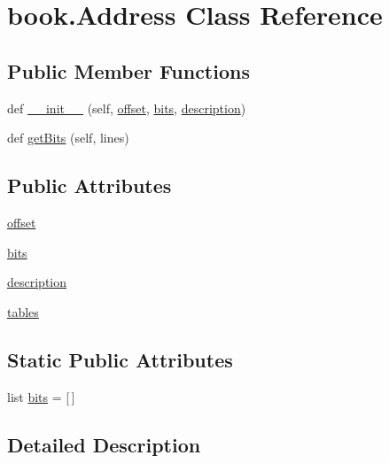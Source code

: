 \hypertarget{classbook_1_1_address}{}\section{book.\+Address Class Reference}
\label{classbook_1_1_address}
\subsection*{Public Member Functions}
\begin{DoxyCompactItemize}
\item 
def \hyperlink{classbook_1_1_address_a21dab1da29e27e05d00fc13f416518ea}{\+\_\+\+\_\+init\+\_\+\+\_\+} (self, \hyperlink{classbook_1_1_address_a1df9c6785a8eb9214ec73703b932c43f}{offset}, \hyperlink{classbook_1_1_address_a5040cf9c4f11a07654d0d621252114aa}{bits}, \hyperlink{classbook_1_1_address_aca6b57c6a0681dfb787ae74d70cf3373}{description})
\item 
def \hyperlink{classbook_1_1_address_a219368a50adc089731da0c44b8b1a880}{get\+Bits} (self, lines)
\end{DoxyCompactItemize}
\subsection*{Public Attributes}
\begin{DoxyCompactItemize}
\item 
\hyperlink{classbook_1_1_address_a1df9c6785a8eb9214ec73703b932c43f}{offset}
\item 
\hyperlink{classbook_1_1_address_abf067b8c097b85a8886928c57e7e7d4f}{bits}
\item 
\hyperlink{classbook_1_1_address_aca6b57c6a0681dfb787ae74d70cf3373}{description}
\item 
\hyperlink{classbook_1_1_address_a1b85dcd18becccd98b66f132ce20009e}{tables}
\end{DoxyCompactItemize}
\subsection*{Static Public Attributes}
\begin{DoxyCompactItemize}
\item 
list \hyperlink{classbook_1_1_address_a5040cf9c4f11a07654d0d621252114aa}{bits} = \mbox{[}$\,$\mbox{]}
\end{DoxyCompactItemize}


\subsection{Detailed Description}


